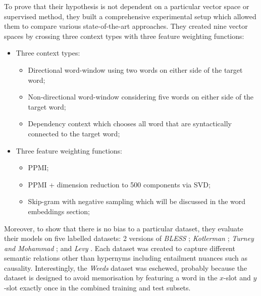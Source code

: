 To prove that their hypothesis is not dependent on a particular vector space or supervised method, they built a comprehensive experimental setup which allowed them to compare various state-of-the-art approaches.  They created nine vector spaces by crossing three context types with three feature weighting functions:
\begin{itemize}
    \item Three context types:
    \begin{itemize}
        \item Directional word-window using two words on either side of the target word;
        \item Non-directional word-window considering five words on either side of the target word;
        \item Dependency context which chooses all word that are syntactically connected to the target word;
    \end{itemize}
    \item Three feature weighting functions:
    \begin{itemize}
        \item \ac{PPMI};
        \item \ac{PPMI} + dimension reduction to 500 components via \ac{SVD};
        \item Skip-gram with negative sampling which will be discussed in the word embeddings section;
    \end{itemize}
\end{itemize}
Moreover, to show that there is no bias to a particular dataset, they evaluate their models on five labelled datasets: 2 versions of \textit{BLESS} \citep{Baroni2011, baroni2012entailment}; \textit{Kotlerman} \citep{kotlerman2010directional}; \textit{Turney and Mohammad} \citep{turney2015experiments}; and \textit{Levy} \citep{levy2014focused}.  Each dataset was created to capture different semantic relations other than hypernyms including entailment nuances such as causality.  Interestingly, the \textit{Weeds} dataset \citep{weeds2014learning} was eschewed, probably because the dataset is designed to avoid memorisation by featuring a word in the $x$-slot and $y$-slot exactly once in the combined training and test subsets.

